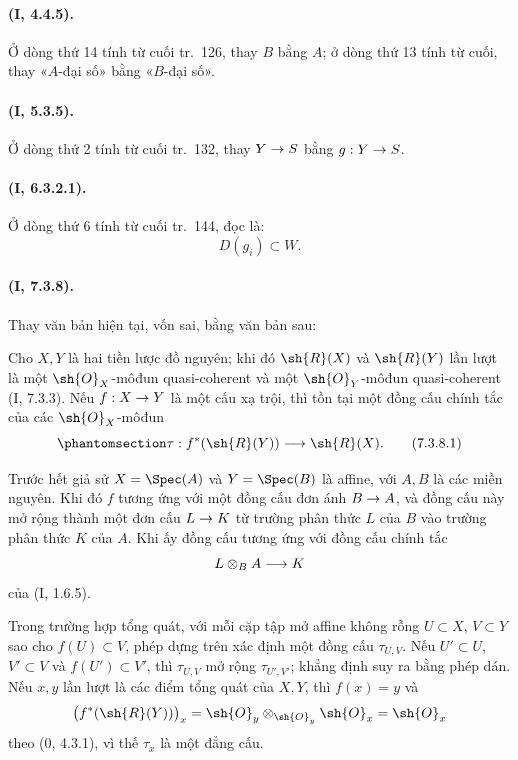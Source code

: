 \documentclass[oneside,10pt]{amsart}
\makeatletter
\newcommand{\ega@arrow}[2]{\mathchoice{#1}{#2}{#2}{#2}}
\renewcommand{\to}{\ega@arrow{\longrightarrow}{\rightarrow}}
\newcommand{\oldpage}[2][]{\marginnote{\normalfont\footnotesize\textbf{#1}~|~#2}\ignorespaces}
\let\EGAOriginalLabel\label
\renewcommand{\label}[1]{\phantomsection\EGAOriginalLabel{#1}}
\makeatother
\begin{document}
\paragraph{(I, 4.4.5).}
Ở dòng thứ 14 tính từ cuối tr.~126, thay $B$ bằng $A$; ở dòng thứ 13
tính từ cuối, thay «$A$-đại số» bằng «$B$-đại số».

\paragraph{(I, 5.3.5).}
Ở dòng thứ 2 tính từ cuối tr.~132, thay $Y\to S$ bằng $g:Y\to S$.

\paragraph{(I, 6.3.2.1).}
Ở dòng thứ 6 tính từ cuối tr.~144, đọc là:
\[
  D(g_i)\subset W.
\]

\paragraph{(I, 7.3.8).}
Thay văn bản hiện tại, vốn sai, bằng văn bản sau:

Cho $X,Y$ là hai tiền lược đồ nguyên; khi đó $\sh{R}(X)$ và
$\sh{R}(Y)$ lần lượt là một $\sh{O}_X$-môđun quasi-coherent và một
$\sh{O}_Y$-môđun quasi-coherent (I, 7.3.3). Nếu $f:X\to Y$ là một cấu
xạ trội, thì tồn tại một đồng cấu chính tắc của các $\sh{O}_X$-môđun
\oldpage[II]{222}
\begin{equation}
\label{ega2:addendum:I.7.3.8.1}
  \tau:f^*(\sh{R}(Y))\to\sh{R}(X).
\tag{7.3.8.1}
\end{equation}

Trước hết giả sử $X=\Spec(A)$ và $Y=\Spec(B)$ là affine, với $A,B$
là các miền nguyên. Khi đó $f$ tương ứng với một đồng cấu đơn ánh
$B\to A$, và đồng cấu này mở rộng thành một đơn cấu $L\to K$ từ trường
phân thức $L$ của $B$ vào trường phân thức $K$ của $A$. Khi ấy đồng
cấu  tương ứng với đồng cấu chính tắc
\[
  L\otimes_B A\to K
\]
của (I, 1.6.5).

Trong trường hợp tổng quát, với mỗi cặp tập mở affine không rỗng
$U\subset X$, $V\subset Y$ sao cho $f(U)\subset V$, phép dựng trên xác
định một đồng cấu $\tau_{U,V}$. Nếu $U'\subset U$, $V'\subset V$ và
$f(U')\subset V'$, thì $\tau_{U,V}$ mở rộng $\tau_{U',V'}$; khẳng định
suy ra bằng phép dán. Nếu $x,y$ lần lượt là các điểm tổng quát của
$X,Y$, thì $f(x)=y$ và
\[
  \bigl(f^*(\sh{R}(Y))\bigr)_x
  =\sh{O}_y\otimes_{\sh{O}_y}\sh{O}_x
  =\sh{O}_x
\]
theo (0, 4.3.1), vì thế $\tau_x$ là một đẳng cấu.
\end{document}
